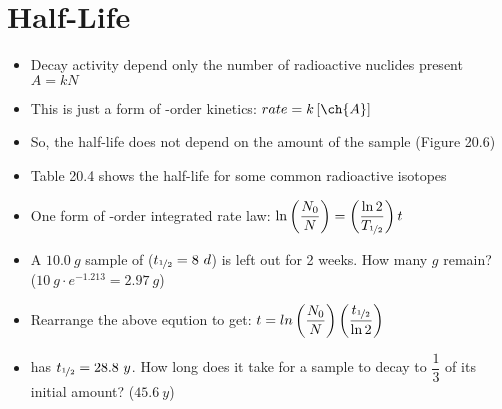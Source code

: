 \documentclass[12pt, openany, letterpaper]{memoir}
\begin{document}
\section{Half-Life}
\begin{itemize}
	\item Decay activity depend only the number of radioactive nuclides present $A=kN$
	\item This is just a form of -order kinetics: $rate=k\left[\ch{A}\right]$
	\item So, the half-life does not depend on the amount of the sample (Figure 20.6)
	\item Table 20.4 shows the half-life for some common radioactive isotopes
	\item One form of -order integrated rate law: $\ln\left(\dfrac{N_0}{N}\right)=\left(\dfrac{\ln 2}{T_{\nicefrac{1}{2}}}\right)t$
	\item A $10.0~g$ sample of  ($t_{\nicefrac{1}{2}}=8~d$) is left out for 2 weeks. How many $g$ remain? \\($10~g\cdot e^{-1.213}=2.97~g$)
	\item Rearrange the above eqution to get: $t = ln\left(\dfrac{N_0}{N}\right)\left(\dfrac{t_{\nicefrac{1}{2}}}{\ln 2}\right)$
	\item {} has $t_{\nicefrac{1}{2}}=28.8~y$. How long does it take for a  sample to decay to $\dfrac{1}{3}$ of its initial amount? ($45.6~y$)
\end{itemize}
\end{document}
